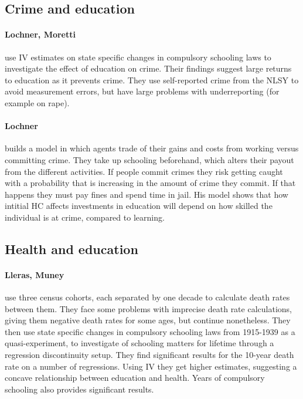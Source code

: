 \documentclass[12pt, a4paper]{article}
\begin{document}
\begin{multicols}{2}
\subsection{Crime and education}

\paragraph{Lochner, Moretti} use IV estimates on state specific changes in compulsory schooling laws to investigate the effect of education on crime. Their findings suggest large returns to education as it prevents crime. They use self-reported crime from the NLSY to avoid measurement errors, but have large problems with underreporting (for example on rape).

\paragraph{Lochner} builds a model in which agents trade of their gains and costs from working versus committing crime. They take up schooling beforehand, which alters their payout from the different activities. If people commit crimes they risk getting caught with a probability that is increasing in the amount of crime they commit. If that happens they must pay fines and spend time in jail. His model shows that how intitial HC affects investments in education will depend on how skilled the individual is at crime, compared to learning. 

\subsection{Health and education}
\paragraph{Lleras, Muney} use three census cohorts, each separated by one decade to calculate death rates between them. They face some problems with imprecise death rate calculations, giving them negative death rates for some ages, but continue nonetheless. They then use state specific changes in compulsory schooling laws from 1915-1939 as a quasi-experiment, to investigate of schooling matters for lifetime through a regression discontinuity setup. They find significant results for the 10-year death rate on a number of regressions. Using IV they get higher estimates, suggesting a concave relationship between education and health. Years of compulsory schooling also provides significant results. 


\end{multicols}
\end{document}
